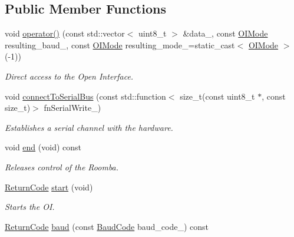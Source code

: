 \subsection*{Public Member Functions}
\begin{DoxyCompactItemize}
\item 
void \hyperlink{classroomba_1_1series500_1_1oi_1_1_o_i_encoder_aab22c772c7033ffeb8cca563ebea42bd}{operator()} (const std\+::vector$<$ uint8\+\_\+t $>$ \&data\+\_\+, const \hyperlink{namespaceroomba_1_1series500_1_1oi_a8dde6b4ac23e862ae50868c3963d7063}{O\+I\+Mode} resulting\+\_\+baud\+\_\+, const \hyperlink{namespaceroomba_1_1series500_1_1oi_a8dde6b4ac23e862ae50868c3963d7063}{O\+I\+Mode} resulting\+\_\+mode\+\_\+=static\+\_\+cast$<$ \hyperlink{namespaceroomba_1_1series500_1_1oi_a8dde6b4ac23e862ae50868c3963d7063}{O\+I\+Mode} $>$(-\/1))
\begin{DoxyCompactList}\small\item\em Direct access to the Open Interface. \end{DoxyCompactList}\item 
void \hyperlink{classroomba_1_1series500_1_1oi_1_1_o_i_encoder_ac70158274e90759a4d93ccf27a076c47}{connect\+To\+Serial\+Bus} (const std\+::function$<$ size\+\_\+t(const uint8\+\_\+t $\ast$, const size\+\_\+t)$>$ fn\+Serial\+Write\+\_\+)
\begin{DoxyCompactList}\small\item\em Establishes a serial channel with the hardware. \end{DoxyCompactList}\item 
void \hyperlink{classroomba_1_1series500_1_1oi_1_1_o_i_encoder_ac4b19dd3355212072fd27700e6d239ad}{end} (void) const 
\begin{DoxyCompactList}\small\item\em Releases control of the Roomba. \end{DoxyCompactList}\item 
\hyperlink{classroomba_1_1series500_1_1oi_1_1_o_i_encoder_ac2c8ad2f0306050926f89882d74696cc}{Return\+Code} \hyperlink{classroomba_1_1series500_1_1oi_1_1_o_i_encoder_a1601020b3fbf4e02e5cd2cf87fbf4432}{start} (void)
\begin{DoxyCompactList}\small\item\em Starts the O\+I. \end{DoxyCompactList}\item 
\hyperlink{classroomba_1_1series500_1_1oi_1_1_o_i_encoder_ac2c8ad2f0306050926f89882d74696cc}{Return\+Code} \hyperlink{classroomba_1_1series500_1_1oi_1_1_o_i_encoder_a063c0c08f5d6ac8fd97d2cbdd4e9f3f9}{baud} (const \hyperlink{namespaceroomba_1_1series500_1_1oi_ae5028fe52e1dabe309aff04a45581bfd}{Baud\+Code} baud\+\_\+code\+\_\+) const 

\end{DoxyCompactItemize}
